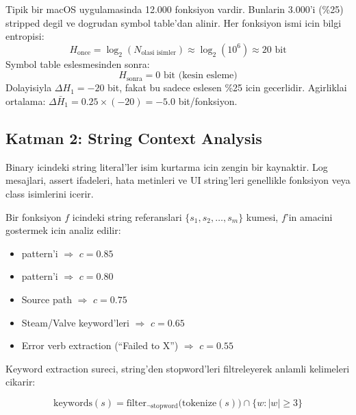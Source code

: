 \begin{example}
Tipik bir macOS uygulamasinda 12.000 fonksiyon vardir. Bunlarin 3.000'i
(\%25) stripped degil ve dogrudan symbol table'dan alinir. Her fonksiyon
ismi icin bilgi entropisi:
\begin{equation}
  H_{\text{once}} = \log_2(N_{\text{olasi isimler}}) \approx \log_2(10^6) \approx 20 \text{ bit}
\end{equation}
Symbol table eslesmesinden sonra:
\begin{equation}
  H_{\text{sonra}} = 0 \text{ bit (kesin esleme)}
\end{equation}
Dolayisiyla $\Delta H_1 = -20$ bit, fakat bu sadece eslesen \%25 icin gecerlidir.
Agirliklai ortalama: $\Delta \bar{H}_1 = 0.25 \times (-20) = -5.0$ bit/fonksiyon.
\end{example}


\subsection{Katman 2: String Context Analysis}
\label{subsec:layer2-string}

Binary icindeki string literal'ler isim kurtarma icin zengin bir kaynaktir.
Log mesajlari, assert ifadeleri, hata metinleri ve UI string'leri genellikle
fonksiyon veya class isimlerini icerir.

\begin{tanim}
Bir fonksiyon $f$ icindeki string referanslari $\{s_1, s_2, \ldots, s_m\}$
kumesi, $f$'in amacini gostermek icin analiz edilir:
\begin{itemize}
  \item {} pattern'i $\Rightarrow$ $c = 0.85$
  \item {} pattern'i $\Rightarrow$ $c = 0.80$
  \item Source path  $\Rightarrow$ $c = 0.75$
  \item Steam/Valve keyword'leri $\Rightarrow$ $c = 0.65$
  \item Error verb extraction (``Failed to X'') $\Rightarrow$ $c = 0.55$
\end{itemize}
\end{tanim}

Keyword extraction sureci, string'den stopword'leri filtreleyerek anlamli
kelimeleri cikarir:

\begin{equation}
  \text{keywords}(s) = \text{filter}_{\neg\text{stopword}}\bigl(
    \text{tokenize}(s)\bigr) \cap \{w : |w| \geq 3\}
  \label{eq:keyword-extract}
\end{equation}

